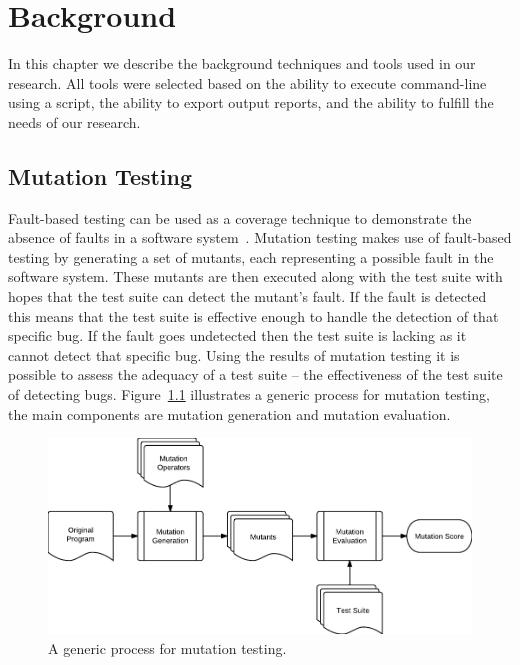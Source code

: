 \chapter{Background}
\label{chap:background}
In this chapter we describe the background techniques and tools used in our research. All tools were selected based on the ability to execute command-line using a script, the ability to export output reports, and the ability to fulfill the needs of our research.


\section{Mutation Testing}
\label{sec:background_mutation_testing}
Fault-based testing can be used as a coverage technique to demonstrate the absence of faults in a software system~\cite{DLS78, BSLS80}. Mutation testing makes use of fault-based testing by generating a set of mutants, each representing a possible fault in the software system. These mutants are then executed along with the test suite with hopes that the test suite can detect the mutant's fault. If the fault is detected this means that the test suite is effective enough to handle the detection of that specific bug. If the fault goes undetected then the test suite is lacking as it cannot detect that specific bug. Using the results of mutation testing it is possible to assess the adequacy of a test suite -- the effectiveness of the test suite of detecting bugs. Figure~\ref{fig:mutation_testing_overview} illustrates a generic process for mutation testing, the main components are mutation generation and mutation evaluation.

\begin{figure}[h!]
  \centering
  \includegraphics[width=14cm]{figures/mutation_testing_overview.pdf}
  \caption{A generic process for mutation testing.}
  \label{fig:mutation_testing_overview}
\end{figure}

